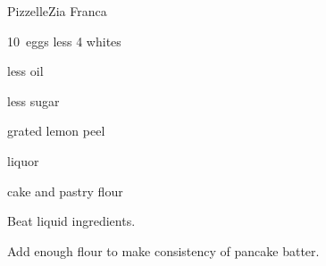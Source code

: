 \begin{recipe}{Pizzelle\FIXME}{Zia Franca}{}

\begin{ingredients}
\item 10~eggs less 4 whites
\item {} less  oil
\item {} less  sugar
\item grated lemon peel
\item {} liquor
\item cake and pastry flour
\end{ingredients}

\begin{directions}
\item Beat liquid ingredients.
\item Add enough flour to make consistency of pancake batter.
\end{directions}

\end{recipe}

